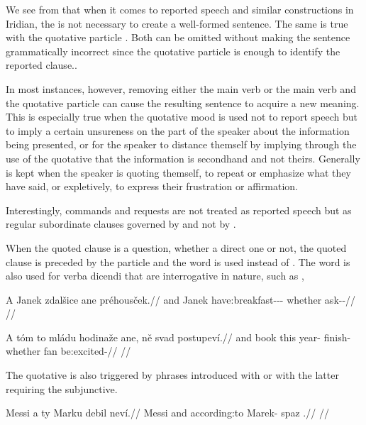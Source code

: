 We see from  that when it comes to reported speech and similar constructions in
Iridian, the  is not necessary to
create a well-formed sentence. The same is true with the quotative particle
. Both can be omitted without making the sentence grammatically
incorrect since the quotative particle is enough to identify the reported
clause..

In most instances, however, removing either the main verb or the main verb and
the quotative particle can cause the resulting sentence to acquire a new
meaning. This is especially true when the quotative mood is used not to report
speech but to imply a certain unsureness on the part of the speaker about the
information being presented, or for the speaker to distance themself by implying
through the use of the quotative that the information is secondhand and not
theirs. Generally  is kept when the speaker is quoting themself, to
repeat or emphasize what they have said, or expletively, to express their
frustration or affirmation.

Interestingly, commands and requests are not treated as reported speech but as
regular subordinate clauses governed by  and not by .

When the quoted clause is a question, whether a direct one or not, the quoted
clause is preceded by the particle  and the word
 is used instead of . The word  is also
used for verba dicendi that are interrogative in nature, such as
,

\pex
\begingl
  \gla A Janek zdalšice ane préhousček.//
  \glb and Janek have:breakfast-\Av{}-\Pf{}-\Quot{} whether ask-\Av{}-\Pf{}//
  \glft {}//
\endgl
\xe

\pex
\begingl
  \gla A tóm to mládu hodinaže ane, ně svad postupeví.//
  \glb and book this year-\Ins{} finish- whether \Pl{} fan be:excited-\Cont{}//
  \glft {}//
\endgl
\xe

The quotative is also triggered by phrases introduced with  or  with the latter requiring the subjunctive. 

\pex
\begingl
  \gla Messi a ty Marku debil neví.//
  \glb Messi and according:to Marek-\Ins{} spaz \Cop{}.\Sbj{}//
  \glft {}//
\endgl
\xe

